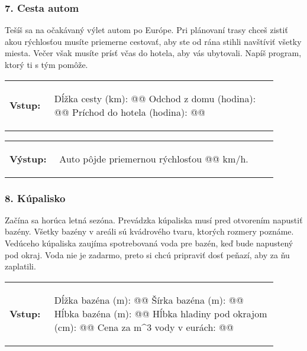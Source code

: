 \subsubsection*{7. Cesta autom}
Tešíš sa na očakávaný výlet autom po Európe. Pri plánovaní trasy chceš zistiť akou rýchlosťou musíte priemerne cestovať, aby ste od rána stihli navštíviť všetky miesta. Večer však musíte prísť včas do hotela, aby vás ubytovali. Napíš program, ktorý ti s tým pomôže.

\begin{tabular}{@{}p{0.15\linewidth}p{0.75\linewidth}}
\textbf{\small Vstup:} &
\vspace{-3em}
\begin{code}
Dĺžka cesty (km): @\fbox{\phantom{vstup}}@
Odchod z domu (hodina): @\fbox{\phantom{vstup}}@
Príchod do hotela (hodina): @\fbox{\phantom{vstup}}@
\end{code}
\end{tabular}

\vspace{-2em}
\begin{tabular}{@{}p{0.15\linewidth}p{0.75\linewidth}}
\textbf{\small Výstup:} &
\vspace{-3em}
\begin{code}
Auto pôjde priemernou rýchlosťou @\fbox{\phantom{vstup}}@ km/h.
\end{code}
\end{tabular}
\vspace{-2em}

\subsubsection*{8. Kúpalisko}
Začína sa horúca letná sezóna. Prevádzka kúpaliska musí pred otvorením napustiť bazény. Všetky bazény v areáli sú kvádrového tvaru, ktorých rozmery poznáme. Vedúceho kúpaliska zaujíma spotrebovaná voda pre bazén, keď bude napustený pod okraj. Voda nie je zadarmo, preto si chcú pripraviť dosť peňazí, aby za ňu zaplatili.

\begin{tabular}{@{}p{0.15\linewidth}p{0.75\linewidth}}
\textbf{\small Vstup:} &
\vspace{-3em}
\begin{code}
Dĺžka bazéna (m): @\fbox{\phantom{vstup}}@
Šírka bazéna (m): @\fbox{\phantom{vstup}}@
Hĺbka bazéna (m): @\fbox{\phantom{vstup}}@
Hĺbka hladiny pod okrajom (cm): @\fbox{\phantom{vstup}}@
Cena za m^3 vody v eurách: @\fbox{\phantom{vstup}}@
\end{code}
\end{tabular}

